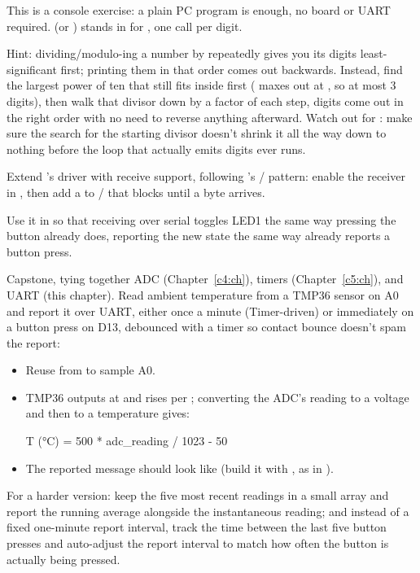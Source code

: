 This is a console exercise: a plain PC program is enough, no board or UART required.
 (or ) stands in for , one call per digit.

Hint: dividing/modulo-ing a number by  repeatedly gives you its digits least-significant
first; printing them in that order comes out backwards. Instead, find the largest power of ten
that still fits inside  first ( maxes out at , so at most 3
digits), then walk that divisor down by a factor of  each step, digits come out in the
right order with no need to reverse anything afterward. Watch out for : make sure the
search for the starting divisor doesn't shrink it all the way down to nothing before the loop that
actually emits digits ever runs.

\label{c6:ex:4}
Extend 's driver with receive support, following 's
/ pattern: enable the receiver in , then add a
 to / that blocks until a byte arrives.

Use it in  so that receiving  over serial toggles LED1 the same way pressing
the button already does, reporting the new state the same way  already reports a
button press.

\label{c6:ex:5}
Capstone, tying together ADC (Chapter~\ref{c4:ch}), timers (Chapter~\ref{c5:ch}), and UART (this
chapter). Read ambient temperature from a TMP36 sensor on A0 and report it over UART, either once a
minute (Timer-driven) or immediately on a button press on D13, debounced with a timer so contact
bounce doesn't spam the report:
\begin{itemize}
  \item Reuse  from  to sample A0.
  \item TMP36 outputs  at  and rises  per ;
    converting the ADC's  reading to a voltage and then to a temperature gives:

\begin{console}
T (°C) = 500 * adc_reading / 1023 - 50
\end{console}

  \item The reported message should look like  (build it with
    , as in ).
\end{itemize}
For a harder version: keep the five most recent readings in a small array and report the running
average alongside the instantaneous reading; and instead of a fixed one-minute report interval,
track the time between the last five button presses and auto-adjust the report interval to match
how often the button is actually being pressed.
